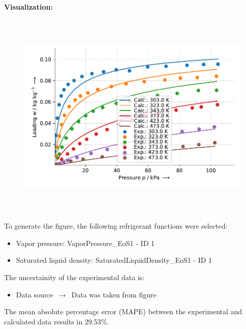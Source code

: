 \textbf{Visualization:}
%
\begin{figure}[!htp]
{\noindent\includegraphics[height=10cm, keepaspectratio]{figs/ads/ads_Propane_zeolite_pellet_13X_Toth_1.pdf}}
\end{figure}
%

To generate the figure, the following refrigerant functions were selected:
\begin{itemize}
\item Vapor pressure: VaporPressure\_EoS1 - ID 1
\item Saturated liquid density: SaturatedLiquidDensity\_EoS1 - ID 1
\end{itemize}

The uncertainity of the experimental data is:
\begin{itemize}
\item Data source $\,\to\,$ Data was taken from figure
\end{itemize}

The mean absolute percentage error (MAPE) between the experimental and calculated data results in 29.53\%.
\FloatBarrier
\newpage
